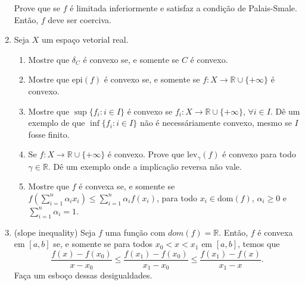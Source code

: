\documentclass[a4paper,latin]{article}
\begin{document}
\begin{enumerate}
    Prove que se $f$ é limitada inferiormente e satisfaz a condição de Palais-Smale. Então, $f$ deve ser coerciva.
    \item Seja $X$ um espaço 
    vetorial real. 
      \begin{enumerate}
      \item  
      Mostre que $\delta_{C}$ é 
      convexo se, e 
      somente se $C$ é convexo.
      \item Mostre que $\text{epi}(f)$
      é convexo se, e somente se 
      $f: X \rightarrow \mathbb{R}\cup\{+\infty\}$ é convexo.
      \item Mostre que 
      $\sup \{f_{i}:i \in I\}$
      é convexo se 
      $f_i: X \rightarrow \mathbb{R}\cup\{+\infty\}$, $\forall i \in I$.
      Dê um exemplo de que 
      $\inf \{f_{i}:i \in I\}$
      não é necessáriamente convexo, mesmo se $I$ fosse finito.      
      \item Se 
      $f: X \rightarrow \mathbb{R}\cup\{+\infty\}$ é convexo. Prove que 
      $\text{lev}_{\gamma}(f)$ é convexo 
      para todo $\gamma \in \mathbb{R}$.
      Dê um exemplo onde a implicação reversa não vale. 
      \item Mostre que $f$ é convexa se, e somente se  $f(\sum_{i=1}^{n} \alpha_{i}x_{i}) \leq \sum_{i=1}^{n}\alpha_i f(x_{i})$, para todo $x_{i} \in \text{dom}(f)$, $\alpha_{i}\geq 0$ e $\sum_{i=1}^{n}\alpha_{i}=1$. 
      \end{enumerate}
   \item (slope inequality) Seja $f$ uma função com
   $dom(f)=\mathbb{R}$.
   Então, $f$ é convexa em $[a,b]$
   se, e somente se para todos $x_{0}<x<x_{1}$ em $[a,b]$, temos que 
   $$\frac{f(x)-f(x_{0})}{x-x_{0}}\leq 
     \frac{f(x_1)-f(x_{0})}{x_1-x_{0}}\leq
     \frac{f(x_1)-f(x)}{x_1-x}.
   $$
   Faça um esboço dessas desigualdades.
    

\end{enumerate}
\end{document}

